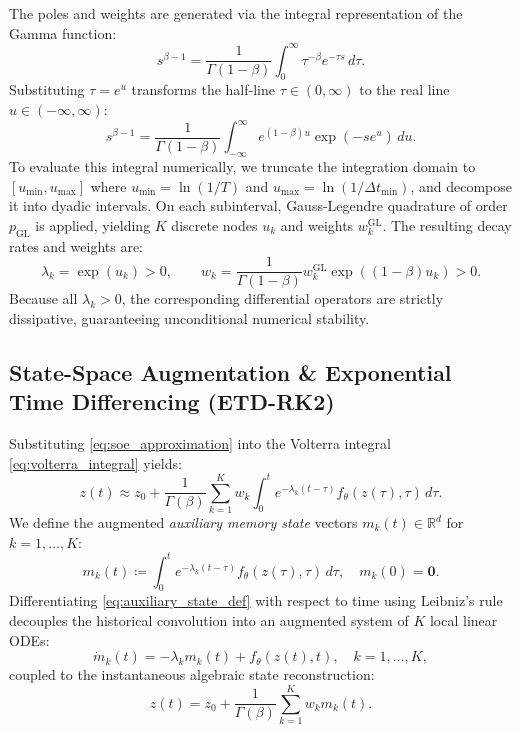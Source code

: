 \documentclass[11pt,a4paper]{article}
\theoremstyle{plain}
\theoremstyle{definition}
\newcommand{\R}{\mathbb{R}}
\newcommand{\dt}{\Delta t}
\begin{document}
The poles and weights are generated via the integral representation of the Gamma function:
\begin{equation}
    s^{\beta - 1} = \frac{1}{\Gamma(1 - \beta)} \int_0^\infty \tau^{-\beta} e^{-\tau s} \, d\tau.
\end{equation}
Substituting $\tau = e^u$ transforms the half-line $\tau \in (0, \infty)$ to the real line $u \in (-\infty, \infty)$:
\begin{equation}
    s^{\beta - 1} = \frac{1}{\Gamma(1 - \beta)} \int_{-\infty}^\infty e^{(1 - \beta) u} \exp\left( -s e^u \right) \, du.
\end{equation}
To evaluate this integral numerically, we truncate the integration domain to $[u_{\min}, u_{\max}]$ where $u_{\min} = \ln(1/T)$ and $u_{\max} = \ln(1/\dt_{\min})$, and decompose it into dyadic intervals. On each subinterval, Gauss-Legendre quadrature of order $p_{\mathrm{GL}}$ is applied, yielding $K$ discrete nodes $u_k$ and weights $w_k^{\mathrm{GL}}$. The resulting decay rates and weights are:
\begin{equation}
    \lambda_k = \exp(u_k) > 0, \qquad w_k = \frac{1}{\Gamma(1 - \beta)} w_k^{\mathrm{GL}} \exp\left( (1 - \beta) u_k \right) > 0.
    \label{eq:dyadic_nodes_weights}
\end{equation}
Because all $\lambda_k > 0$, the corresponding differential operators are strictly dissipative, guaranteeing unconditional numerical stability.

\subsection{State-Space Augmentation \& Exponential Time Differencing (ETD-RK2)}
Substituting \cref{eq:soe_approximation} into the Volterra integral \cref{eq:volterra_integral} yields:
\begin{equation}
    z(t) \approx z_0 + \frac{1}{\Gamma(\beta)} \sum_{k=1}^K w_k \int_0^t e^{-\lambda_k (t - \tau)} f_\theta(z(\tau), \tau) \, d\tau.
    \label{eq:volterra_soe}
\end{equation}
We define the augmented \emph{auxiliary memory state} vectors $m_k(t) \in \R^d$ for $k = 1, \dots, K$:
\begin{equation}
    m_k(t) \coloneqq \int_0^t e^{-\lambda_k (t - \tau)} f_\theta(z(\tau), \tau) \, d\tau, \quad m_k(0) = \mathbf{0}.
    \label{eq:auxiliary_state_def}
\end{equation}
Differentiating \cref{eq:auxiliary_state_def} with respect to time using Leibniz's rule decouples the historical convolution into an augmented system of $K$ local linear ODEs:
\begin{equation}
    \dot{m}_k(t) = -\lambda_k m_k(t) + f_\theta(z(t), t), \quad k = 1, \dots, K,
    \label{eq:auxiliary_ode}
\end{equation}
coupled to the instantaneous algebraic state reconstruction:
\begin{equation}
    z(t) = z_0 + \frac{1}{\Gamma(\beta)} \sum_{k=1}^K w_k m_k(t).
    \label{eq:state_reconstruction}
\end{equation}
\end{document}
